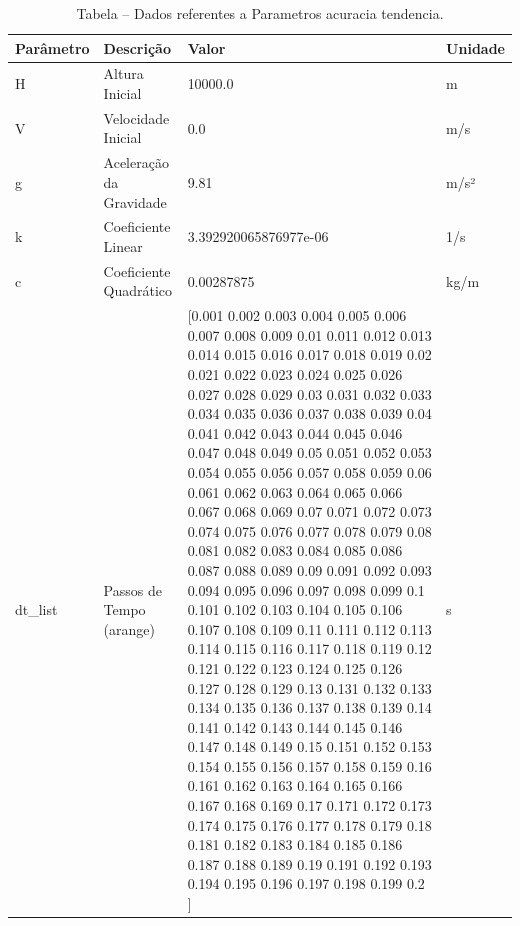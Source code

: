 \begin{table}[H]
\centering
\caption{Tabela – Dados referentes a Parametros acuracia tendencia.}
\label{tab:parametros_acuracia_tendencia}
\begin{tabular}{l l l p{8cm}}
\toprule
Parâmetro & Descrição & Valor & Unidade \\
\midrule
H & Altura Inicial & 10000.0 & m \\
V & Velocidade Inicial & 0.0 & m/s \\
g & Aceleração da Gravidade & 9.81 & m/s² \\
k & Coeficiente Linear & 3.392920065876977e-06 & 1/s \\
c & Coeficiente Quadrático & 0.00287875 & kg/m \\
dt\_list & Passos de Tempo (arange) & [0.001 0.002 0.003 0.004 0.005 0.006 0.007 0.008 0.009 0.01  0.011 0.012
 0.013 0.014 0.015 0.016 0.017 0.018 0.019 0.02  0.021 0.022 0.023 0.024
 0.025 0.026 0.027 0.028 0.029 0.03  0.031 0.032 0.033 0.034 0.035 0.036
 0.037 0.038 0.039 0.04  0.041 0.042 0.043 0.044 0.045 0.046 0.047 0.048
 0.049 0.05  0.051 0.052 0.053 0.054 0.055 0.056 0.057 0.058 0.059 0.06
 0.061 0.062 0.063 0.064 0.065 0.066 0.067 0.068 0.069 0.07  0.071 0.072
 0.073 0.074 0.075 0.076 0.077 0.078 0.079 0.08  0.081 0.082 0.083 0.084
 0.085 0.086 0.087 0.088 0.089 0.09  0.091 0.092 0.093 0.094 0.095 0.096
 0.097 0.098 0.099 0.1   0.101 0.102 0.103 0.104 0.105 0.106 0.107 0.108
 0.109 0.11  0.111 0.112 0.113 0.114 0.115 0.116 0.117 0.118 0.119 0.12
 0.121 0.122 0.123 0.124 0.125 0.126 0.127 0.128 0.129 0.13  0.131 0.132
 0.133 0.134 0.135 0.136 0.137 0.138 0.139 0.14  0.141 0.142 0.143 0.144
 0.145 0.146 0.147 0.148 0.149 0.15  0.151 0.152 0.153 0.154 0.155 0.156
 0.157 0.158 0.159 0.16  0.161 0.162 0.163 0.164 0.165 0.166 0.167 0.168
 0.169 0.17  0.171 0.172 0.173 0.174 0.175 0.176 0.177 0.178 0.179 0.18
 0.181 0.182 0.183 0.184 0.185 0.186 0.187 0.188 0.189 0.19  0.191 0.192
 0.193 0.194 0.195 0.196 0.197 0.198 0.199 0.2  ] & s \\
\bottomrule
\end{tabular}

\end{table}
